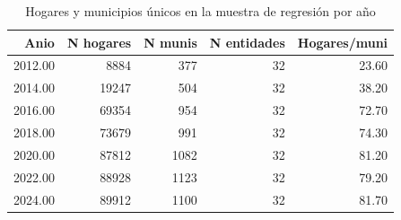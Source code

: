 \begin{table}[ht]
\centering
\caption{Hogares y municipios únicos en la muestra de regresi\'on por a\~{n}o} 
\label{tab:14a_panel_hogares_munis}
\begin{tabular}{rrrrr}
  \toprule
Anio & N hogares & N munis & N entidades & Hogares/muni \\ 
  \midrule
2012.00 & 8884 & 377 &  32 & 23.60 \\ 
  2014.00 & 19247 & 504 &  32 & 38.20 \\ 
  2016.00 & 69354 & 954 &  32 & 72.70 \\ 
  2018.00 & 73679 & 991 &  32 & 74.30 \\ 
  2020.00 & 87812 & 1082 &  32 & 81.20 \\ 
  2022.00 & 88928 & 1123 &  32 & 79.20 \\ 
  2024.00 & 89912 & 1100 &  32 & 81.70 \\ 
   \bottomrule
\end{tabular}
\end{table}

